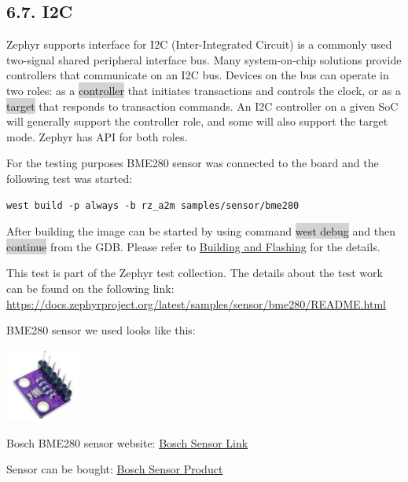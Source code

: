\documentclass[11pt,a4paper,oneside]{article}
\begin{document}
\subsection*{6.7. I2C}\label{i2c}

Zephyr supports interface for I2C (Inter-Integrated Circuit) is a
commonly used two-signal shared peripheral interface bus. Many
system-on-chip solutions provide controllers that communicate on an I2C
bus. Devices on the bus can operate in two roles: as a \colorbox{lightgray}{controller}
that initiates transactions and controls the clock, or as a \colorbox{lightgray}{target}
that responds to transaction commands. An I2C controller on a given SoC
will generally support the controller role, and some will also support
the target mode. Zephyr has API for both roles.

For the testing purposes BME280 sensor was connected to the board and
the following test was started:

\begin{lstlisting}
west build -p always -b rz_a2m samples/sensor/bme280
\end{lstlisting}

After building the image can be started by using command \colorbox{lightgray}{west debug}
and then \colorbox{lightgray}{continue} from the GDB. Please refer to
\hyperref[building-and-flashing]{Building and Flashing} for the
details.

This test is part of the Zephyr test collection. The details about the
test work can be found on the following link:
\url{https://docs.zephyrproject.org/latest/samples/sensor/bme280/README.html}

BME280 sensor we used looks like this:

\includegraphics[width=0.9532in,height=0.9532in]{./media/sensor.jpg}

Bosch BME280 sensor website:
\href{https://www.bosch-sensortec.com/products/environmental-sensors/humidity-sensors-bme280/}{Bosch Sensor Link}

Sensor can be bought:
\href{https://www.ebay.com/itm/364383183367?hash=item54d6ee2207:g:9nEAAOSw4cpkxb8e&amdata=enc%3AAQAIAAAA4CNZsveLKwB%2Bbtxwddq1XA6AG7ZzLUZUtkEJhofNOcOAZjNwrE0ntieLQd5z8eMQSMN4aEAFGeL9B0uKgDHIB5ddwS%2Fi527%2BUBISab8tuIGQ8kBnJHzsWjBE694%2BuPxyY3NLa1RkA3foa27rLBqN1YVo03DFl%2B2%2BNc1wHeuZNNm0jSITv1Aso5b2eog66imoO2sq3R6BcKmTUTOX7s97n0S8hSnJw1F0QVlssPYZjHj%2FX4oZGFYYy5uiIgy5LghN4WszDLbwRhgW4WY%2B61Xdgdm91qSggfJF3wPw05%2BA2AAt%7Ctkp%3ABFBMtKColdxi}{Bosch Sensor Product}
\end{document}
